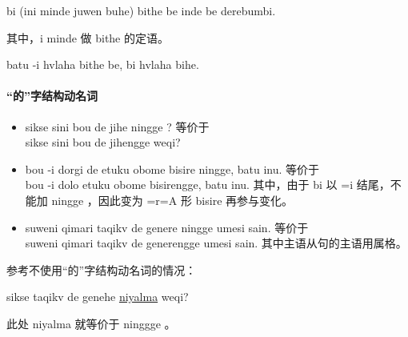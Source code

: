 bi (ini minde juwen buhe) bithe be inde be derebumbi.

其中，i minde   做 bithe 的定语。

batu -i hvlaha bithe be, bi  hvlaha bihe.

\paragraph{“的”字结构动名词}

\begin{itemize}
    \item sikse sini bou de jihe ningge ? 等价于\\
          sikse sini bou de jihengge weqi?
    \item bou -i dorgi de etuku obome bisire ningge, batu inu. 等价于\\
          bou -i dolo etuku obome bisirengge, batu inu. 其中，由于 bi 以 =i 结尾，不能加 ningge ，因此变为 =r=A 形 bisire 再参与变化。
    \item suweni qimari taqikv de genere ningge umesi sain. 等价于\\
          suweni qimari taqikv de generengge umesi sain. 其中主语从句的主语用属格。
\end{itemize}

参考不使用“的”字结构动名词的情况：

sikse taqikv de genehe \underline{niyalma} weqi?

此处 niyalma 就等价于 ninggge 。


